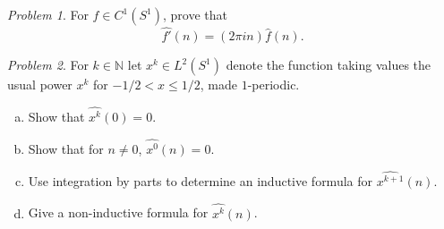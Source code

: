 \documentclass[11pt,twoside]{amsart}
\theoremstyle{plain}
\theoremstyle{remark}
\newtheorem{prob}{Problem}
\theoremstyle{definition}
\theoremstyle{definition}
\newcommand{\NN}{\mathbb{N}}
\begin{document}

\begin{prob}
For $f\in C^1(S^1)$, prove that
\[
  \widehat{f'}(n) = (2\pi i n)\hat f(n).
\]
\end{prob}


\begin{prob}
For $k\in \NN$ let $x^k\in L^2(S^1)$ denote the function taking values the usual power $x^k$ for $-1/2<x\le 1/2$, made $1$-periodic.
\begin{enumerate}[(a)]
\item Show that $\widehat{x^k}(0) = 0$.
\item Show that for $n\ne 0$, $\widehat{x^0}(n) = 0$.
\item Use integration by parts to determine an inductive formula for $\widehat{x^{k+1}}(n)$.
\item Give a non-inductive formula for $\widehat{x^k}(n)$.
\end{enumerate}
\end{prob}

\end{document}
